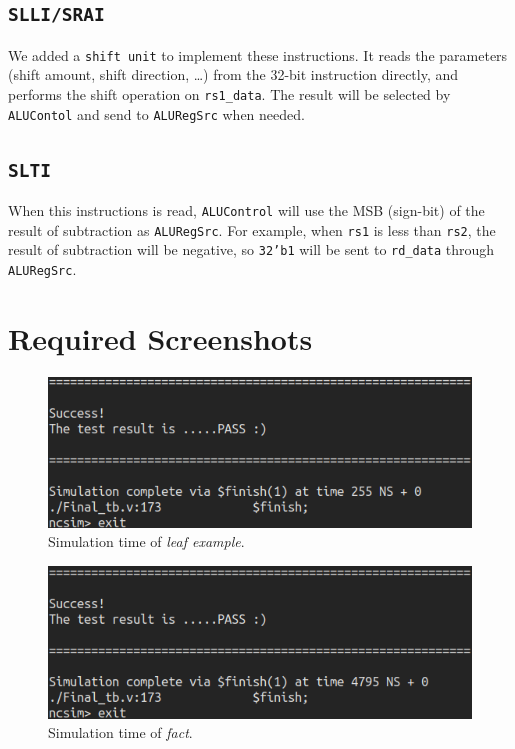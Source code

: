 \documentclass[12pt]{article}
\begin{document}
\subsection{\texttt{SLLI/SRAI}}
We added a \texttt{shift unit} to implement these instructions. It reads the parameters
(shift amount, shift direction, \dots) from the 32-bit instruction directly, and performs
the shift operation on \texttt{rs1\_data}. The result will be selected by 
\texttt{ALUContol} and send to \texttt{ALURegSrc} when needed.

\subsection{\texttt{SLTI}}
When this instructions is read, \texttt{ALUControl} will use the MSB (sign-bit) of the 
result of subtraction as \texttt{ALURegSrc}. For example, when \texttt{rs1} is less
than \texttt{rs2}, the result of subtraction will be negative, so \texttt{32'b1} will 
be sent to \texttt{rd\_data} through \texttt{ALURegSrc}.

    

\section{Required Screenshots}%
\label{sec:required_screenshots}

\begin{figure}[H]
	\centering
	\includegraphics[width=\linewidth]{./leaf.png}
	\caption{Simulation time of \textit{leaf example}.}%
	\label{fig:leaf}
\end{figure}

\begin{figure}[H]
	\centering
	\includegraphics[width=\linewidth]{./fact.png}
	\caption{Simulation time of \textit{fact}.}%
	\label{fig:fact}
\end{figure}
\end{document}
